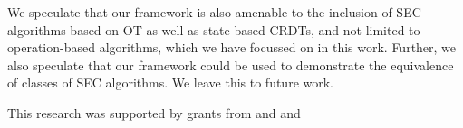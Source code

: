 \documentclass[acmlarge,review,anonymous]{acmart}\settopmatter{printfolios=true}
\begin{document}
We speculate that our framework is also amenable to the inclusion of SEC algorithms based on OT as well as state-based CRDTs, and not limited to operation-based algorithms, which we have focussed on in this work.
Further, we also speculate that our framework could be used to demonstrate the equivalence of classes of SEC algorithms.
We leave this to future work.

\begin{acks}
    This research was supported by grants from
     and
     and

\end{acks}

{}
\end{document}
